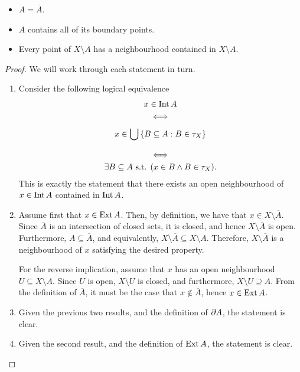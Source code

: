 \begin{proposition}
\begin{enumerate}
\begin{itemize}
			      \item $ A = \overline{A} $.
			      \item $ A $ contains all of its boundary points.
			      \item Every point of $ X \setminus A $ has a neighbourhood contained in $ X \setminus A $.
		      \end{itemize}
	\end{enumerate}
	\begin{proof}
		We will work through each statement in turn.
		\begin{enumerate}
			\item Consider the following logical equivalence
			      \begin{gather*}
				      x \in \operatorname{Int}{A}                                       \\
				      \iff                                                     \\
				      x \in \bigcup_{}^{}{\{ B \subseteq A: B \in \tau_{X} \}} \\
				      \iff                                                     \\
				      \exists B \subseteq A \text{ s.t. } ( x \in B \land B \in \tau_{X}).
			      \end{gather*}
			      This is exactly the statement that there exists an open neighbourhood of $ x \in \operatorname{Int}{A} $ contained in $ \operatorname{Int}{A} $.
			\item Assume first that $ x \in \operatorname{Ext}{A} $. Then, by definition, we have that $ x \in X \setminus \overline{A} $. Since $ \overline{A} $ is an intersection of closed sets, it is closed, and hence $ X \setminus \overline{A} $ is open. Furthermore, $ A \subseteq \overline{A} $, and equivalently, $ X \setminus \overline{A}\subseteq X \setminus A $. Therefore, $ X \setminus \overline{A} $ is a neighbourhood of $ x $ satisfying the desired property.

			      For the reverse implication, assume that $ x $ has an open neighbourhood $ U \subseteq X \setminus A $. Since $ U $ is open, $ X \setminus U $ is closed, and furthermore, $ X \setminus U \supseteq A $. From the definition of $ \overline{A} $, it must be the case that $ x \not\in \overline{A} $, hence $ x \in \operatorname{Ext}{A} $.

			\item Given the previous two results, and the definition of $ \operatorname{\partial\!}{A} $, the statement is clear.

			\item Given the second result, and the definition of $ \operatorname{Ext}{A} $, the statement is clear.


\end{enumerate}
\end{proof}
\end{proposition}
